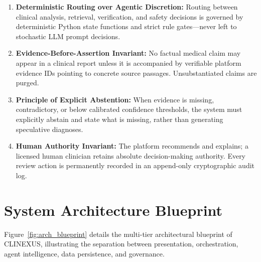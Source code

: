 \documentclass[12pt,a4paper]{report}
\begin{document}
\begin{enumerate}
    \item \textbf{Deterministic Routing over Agentic Discretion:} Routing between clinical analysis, retrieval, verification, and safety decisions is governed by deterministic Python state functions and strict rule gates---never left to stochastic LLM prompt decisions.
    \item \textbf{Evidence-Before-Assertion Invariant:} No factual medical claim may appear in a clinical report unless it is accompanied by verifiable platform evidence IDs pointing to concrete source passages. Unsubstantiated claims are purged.
    \item \textbf{Principle of Explicit Abstention:} When evidence is missing, contradictory, or below calibrated confidence thresholds, the system must explicitly abstain and state what is missing, rather than generating speculative diagnoses.
    \item \textbf{Human Authority Invariant:} The platform recommends and explains; a licensed human clinician retains absolute decision-making authority. Every review action is permanently recorded in an append-only cryptographic audit log.
\end{enumerate}

\section{System Architecture Blueprint}
Figure~\ref{fig:arch_blueprint} details the multi-tier architectural blueprint of CLINEXUS, illustrating the separation between presentation, orchestration, agent intelligence, data persistence, and governance.
\end{document}
